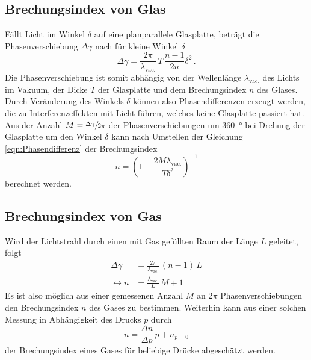 \subsection{Brechungsindex von Glas}
Fällt Licht im Winkel $\delta$ auf eine planparallele Glasplatte, beträgt die Phasenverschiebung $\Delta \gamma$ nach \cite{anleitung} für kleine Winkel $\delta$
\begin{equation} \label{eqn:Phasendifferenz}
  \Delta \gamma = \frac{2 \pi}{\lambda_\text{vac.}} \, T \, \frac{n-1}{2n} \delta^2 \, .
\end{equation}
Die Phasenverschiebung ist somit abhängig von der Wellenlänge $\lambda_\text{vac.}$ des Lichts im Vakuum, der Dicke $T$ der Glasplatte und dem Brechungsindex $n$ des Glases.
Durch Veränderung des Winkels $\delta$ können also Phasendifferenzen erzeugt werden, die zu Interferenzeffekten mit Licht führen, welches keine Glasplatte passiert hat.
Aus der Anzahl $M = \sfrac{\Delta \gamma}{2 \pi}$ der Phasenverschiebungen um \SI{360}{\degree} bei Drehung der Glasplatte um den Winkel $\delta$ kann nach Umstellen der Gleichung \eqref{eqn:Phasendifferenz} der Brechungsindex
\begin{equation}\label{eqn:n_Glas}
  n = \left( 1 - \frac{2 M \lambda_\text{vac.}}{T \delta^2} \right)^{-1}
\end{equation}
berechnet werden.


\subsection{Brechungsindex von Gas}

Wird der Lichtstrahl durch einen mit Gas gefüllten Raum der Länge $L$ geleitet, folgt
\begin{equation} \label{eqn:n_Gas}
  \begin{split}
  \Delta \gamma &= \frac{2 \pi}{\lambda_\text{vac.}} \, (n-1) \, L \\
  \leftrightarrow n &= \frac{\lambda_\text{vac.}}{L} \,  M + 1
  \end{split}
\end{equation}
Es ist also möglich aus einer gemessenen Anzahl $M$ an $2 \pi$ Phasenverschiebungen den Brechungsindex $n$ des Gases zu bestimmen.
Weiterhin kann aus einer solchen Messung in Abhängigkeit des Drucks $p$ durch
\begin{equation*}
  n = \frac{\Delta n}{\Delta p} \, p + n_{p=0}
\end{equation*}
der Brechungsindex eines Gases für beliebige Drücke abgeschätzt werden.
